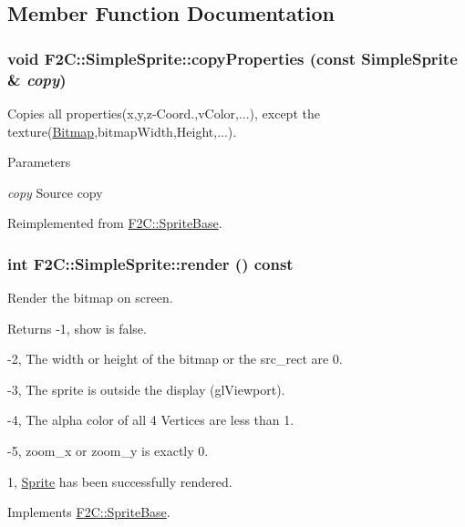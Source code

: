 \subsection{Member Function Documentation}
\hypertarget{class_f2_c_1_1_simple_sprite_a1aa8944250c186b4a88c7bf7850fbb67}{
\subsubsection[{copyProperties}]{\setlength{\rightskip}{0pt plus 5cm}void F2C::SimpleSprite::copyProperties (const {\bf SimpleSprite} \& {\em copy})}}
\label{class_f2_c_1_1_simple_sprite_a1aa8944250c186b4a88c7bf7850fbb67}


Copies all properties(x,y,z-\/Coord.,vColor,...), except the texture(\hyperlink{class_f2_c_1_1_bitmap}{Bitmap},bitmapWidth,Height,...). 
\begin{DoxyParams}{Parameters}
\item[{\em copy}]Source copy \end{DoxyParams}


Reimplemented from \hyperlink{class_f2_c_1_1_sprite_base_a8f7ea8a95a07688bfb2e6268a52b9215}{F2C::SpriteBase}.\hypertarget{class_f2_c_1_1_simple_sprite_a94d58e6e46796a7352486817d51a1c3f}{
\subsubsection[{render}]{\setlength{\rightskip}{0pt plus 5cm}int F2C::SimpleSprite::render () const}}
\label{class_f2_c_1_1_simple_sprite_a94d58e6e46796a7352486817d51a1c3f}


Render the bitmap on screen. \begin{DoxyReturn}{Returns}
-\/1, show is false. 

-\/2, The width or height of the bitmap or the src\_\-rect are 0. 

-\/3, The sprite is outside the display (glViewport). 

-\/4, The alpha color of all 4 Vertices are less than 1. 

-\/5, zoom\_\-x or zoom\_\-y is exactly 0. 

1, \hyperlink{class_f2_c_1_1_sprite}{Sprite} has been successfully rendered. 
\end{DoxyReturn}


Implements \hyperlink{class_f2_c_1_1_sprite_base_af9dfc70083ca5a774d3874b61a6f9abc}{F2C::SpriteBase}.